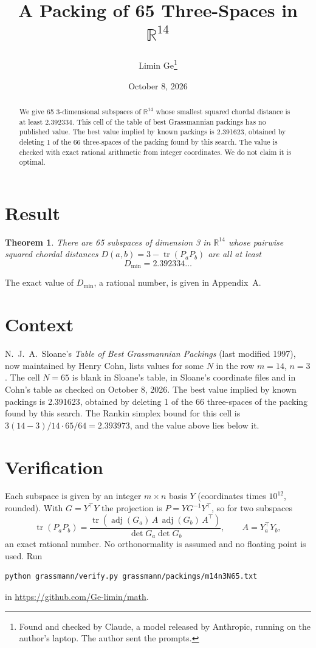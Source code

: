 \documentclass[11pt,a4paper]{article}
\title{A Packing of 65 Three-Spaces in $\mathbb{R}^{14}$}
\author{Limin Ge\thanks{Found and checked by Claude, a model released by Anthropic, running on the author's laptop. The author sent the prompts.}}
\date{October 8, 2026}
\newtheorem*{theorem}{Theorem}
\begin{document}
\maketitle
\begin{abstract}
We give 65 3-dimensional subspaces of $\mathbb{R}^{14}$ whose smallest squared chordal distance is at least 2.392334. This cell of the table of best Grassmannian packings has no published value. The best value implied by known packings is 2.391623, obtained by deleting 1 of the 66 three-spaces of the packing found by this search. The value is checked with exact rational arithmetic from integer coordinates. We do not claim it is optimal.
\end{abstract}

\section{Result}
\begin{theorem}
There are 65 subspaces of dimension 3 in $\mathbb{R}^{14}$ whose pairwise squared chordal distances $D(a,b) = 3 - \operatorname{tr}(P_aP_b)$ are all at least
\[ D_{\min} = 2.392334\ldots \]
\end{theorem}
The exact value of $D_{\min}$, a rational number, is given in Appendix~A.


\section{Context}
N.~J.~A.~Sloane's \emph{Table of Best Grassmannian Packings} (last modified 1997), now maintained by Henry Cohn, lists values for some $N$ in the row $m=14$, $n=3$. The cell $N=65$ is blank in Sloane's table, in Sloane's coordinate files and in Cohn's table as checked on October 8, 2026. The best value implied by known packings is 2.391623, obtained by deleting 1 of the 66 three-spaces of the packing found by this search. The Rankin simplex bound for this cell is $3(14-3)/14\cdot 65/64 = 2.393973$, and the value above lies below it.


\section{Verification}
Each subspace is given by an integer $m\times n$ basis $Y$ (coordinates times $10^{12}$, rounded). With $G=Y^\top Y$ the projection is $P=YG^{-1}Y^\top$, so for two subspaces
\[ \operatorname{tr}(P_aP_b)=\frac{\operatorname{tr}(\operatorname{adj}(G_a)\,A\,\operatorname{adj}(G_b)\,A^\top)}{\det G_a\det G_b},\qquad A=Y_a^\top Y_b, \]
an exact rational number. No orthonormality is assumed and no floating point is used. Run
\begin{verbatim}
python grassmann/verify.py grassmann/packings/m14n3N65.txt
\end{verbatim}
in \url{https://github.com/Ge-limin/math}.
\end{document}

